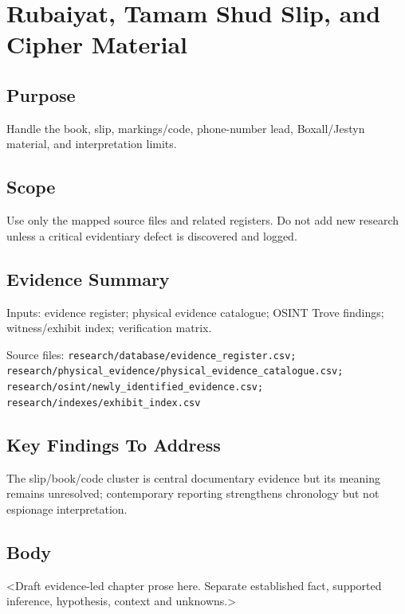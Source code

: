 
\chapter{Rubaiyat, Tamam Shud Slip, and Cipher Material}
\label{chap:07-rubaiyat-cipher}


\section{Purpose}
Handle the book, slip, markings/code, phone-number lead, Boxall/Jestyn material, and interpretation limits.

\section{Scope}
Use only the mapped source files and related registers. Do not add new research unless a critical evidentiary defect is discovered and logged.

\section{Evidence Summary}
Inputs: evidence register; physical evidence catalogue; OSINT Trove findings; witness/exhibit index; verification matrix.

Source files: \texttt{research/database/evidence_register.csv; research/physical_evidence/physical_evidence_catalogue.csv; research/osint/newly_identified_evidence.csv; research/indexes/exhibit_index.csv}

\section{Key Findings To Address}
The slip/book/code cluster is central documentary evidence but its meaning remains unresolved; contemporary reporting strengthens chronology but not espionage interpretation.

\section{Body}
<Draft evidence-led chapter prose here. Separate established fact, supported inference, hypothesis, context and unknowns.>

